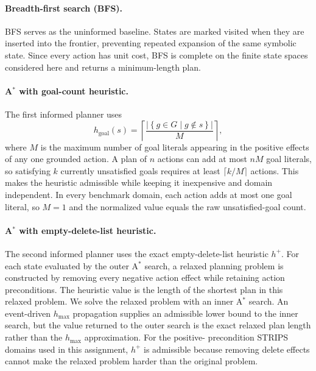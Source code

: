 \paragraph{Breadth-first search (BFS).}
BFS serves as the uninformed baseline.  States are marked visited when they are
inserted into the frontier, preventing repeated expansion of the same symbolic
state.  Since every action has unit cost, BFS is complete on the finite state
spaces considered here and returns a minimum-length plan.

\paragraph{A$^\ast$ with goal-count heuristic.}
The first informed planner uses
\begin{equation}
    h_{\mathrm{goal}}(s)
    = \left\lceil
      \frac{\left|\left\{g \in G \mid g \notin s\right\}\right|}{M}
      \right\rceil,
\end{equation}
where $M$ is the maximum number of goal literals appearing in the positive
effects of any one grounded action.  A plan of $n$ actions can add at most $nM$
goal literals, so satisfying $k$ currently unsatisfied goals requires at least
$\lceil k/M \rceil$ actions.  This makes the heuristic admissible while keeping
it inexpensive and domain independent.  In every benchmark domain, each action
adds at most one goal literal, so $M=1$ and the normalized value equals the raw
unsatisfied-goal count.

\paragraph{A$^\ast$ with empty-delete-list heuristic.}
The second informed planner uses the exact empty-delete-list heuristic $h^+$.
For each state evaluated by the outer A$^\ast$ search, a relaxed planning problem
is constructed by removing every negative action effect while retaining action
preconditions.  The heuristic value is the length of the shortest plan in this
relaxed problem.  We solve the relaxed problem with an inner A$^\ast$ search.  An
event-driven $h_{\max}$ propagation supplies an admissible lower bound to the
inner search, but the value returned to the outer search is the exact relaxed
plan length rather than the $h_{\max}$ approximation.  For the positive-
precondition STRIPS domains used in this assignment, $h^+$ is admissible because
removing delete effects cannot make the relaxed problem harder than the original
problem.

